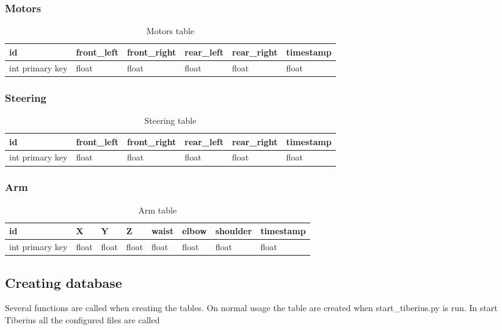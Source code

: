 \subsubsection{Motors}
\begin{table}[!htb]
\centering
\caption{Motors table}
\label{tab:db-motors}
\begin{tabular}{@{}llllll@{}}
\toprule
id              & front\_left & front\_right & rear\_left & rear\_right & timestamp \\ \midrule
int primary key & float       & float        & float      & float       & float
\end{tabular}
\end{table}

\subsubsection{Steering}
\begin{table}[!htb]
\centering
\caption{Steering table}
\label{tab:db-steering}
\begin{tabular}{@{}llllll@{}}
\toprule
id              & front\_left & front\_right & rear\_left & rear\_right & timestamp \\ \midrule
int primary key & float       & float        & float      & float       & float
\end{tabular}
\end{table}

\subsubsection{Arm}
\begin{table}[!htb]
\centering
\caption{Arm table}
\label{tab:db-arm}
\begin{tabular}{@{}llllllll@{}}
\toprule
id              & X     & Y     & Z     & waist & elbow & shoulder & timestamp \\ \midrule
int primary key & float & float & float & float & float & float    & float
\end{tabular}
\end{table}


\subsection{Creating database}
Several functions are called when creating the tables. On normal usage the table are created when start\_tiberius.py is run. In start Tiberius all the configured files are called




